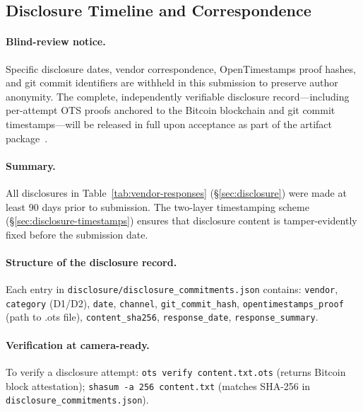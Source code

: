 
\subsection{Disclosure Timeline and Correspondence}
\label{app:disclosure}

\paragraph{Blind-review notice.}
Specific disclosure dates, vendor correspondence, OpenTimestamps proof
hashes, and git commit identifiers are withheld in this submission to
preserve author anonymity. The complete, independently verifiable disclosure
record---including per-attempt OTS proofs anchored to the Bitcoin
blockchain and git commit timestamps---will be released in full upon
acceptance as part of the artifact package~\cite{artifact-repo}.

\paragraph{Summary.}
All disclosures in Table~\ref{tab:vendor-responses} (\S\ref{sec:disclosure})
were made at least 90 days prior to submission. The two-layer timestamping
scheme (\S\ref{sec:disclosure-timestamps}) ensures that disclosure content
is tamper-evidently fixed before the submission date.

\paragraph{Structure of the disclosure record.}
Each entry in \texttt{disclosure/disclosure\_commitments.json} contains:
\texttt{vendor}, \texttt{category} (D1/D2), \texttt{date},
\texttt{channel}, \texttt{git\_commit\_hash},
\texttt{opentimestamps\_proof} (path to .ots file),
\texttt{content\_sha256}, \texttt{response\_date}, \texttt{response\_summary}.

\paragraph{Verification at camera-ready.}
To verify a disclosure attempt: \texttt{ots verify content.txt.ots}
(returns Bitcoin block attestation); \texttt{shasum -a 256 content.txt}
(matches SHA-256 in \texttt{disclosure\_commitments.json}).
